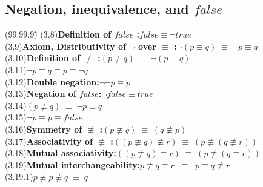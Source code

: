 \documentclass[fleqn, leqno]{article}
\newcommand{\lgap}{2pt}                             %
\newcommand{\equivs}{\ensuremath{\;\equiv\;}}       %
\newcommand{\equivss}{\ensuremath{\;\;\equiv\;\;}}  %
\newcommand{\nequiv}{\ensuremath{\not\equiv}}       %
\begin{document}
\subsection*{Negation, inequivalence, and $false$}
\begin{tabbing}
(99.99.9)\;\=\kill
(3.8)\>\textbf{Definition of $false$ :}\quad $false\equiv \neg true$\\[\lgap]
(3.9)\>\textbf{Axiom, Distributivity of $\neg$ over $\equiv$ :}\quad $\neg (p\equiv q) \equivs \neg p \equiv q$\\[\lgap]
(3.10)\>\textbf{Definition of $\nequiv$ :}\quad $(p\nequiv q)\equivs\neg(p\equiv q)$\\[\lgap]
(3.11)\>$\neg p \equiv q \equiv p \equiv \neg q$\\[\lgap]
(3.12)\>\textbf{Double negation:}\quad $\neg\neg p\equiv p$\\[\lgap]
(3.13)\>\textbf{Negation of $false$:}\quad $\neg false\equiv true$\\[\lgap]
(3.14)\>$(p\nequiv q)\equivs\neg p\equiv q$\\[\lgap]
(3.15)\>$\neg p\equiv p\equiv false$\\[\lgap]
(3.16)\>\textbf{Symmetry of $\nequiv$ :}\quad $(p\nequiv q) \equivs (q\nequiv p)$\\[\lgap]
(3.17)\>\textbf{Associativity of $\nequiv$ :}\quad $((p\nequiv q) \nequiv r)\equivs (p\nequiv (q\nequiv r))$\\[\lgap]
(3.18)\>\textbf{Mutual associativity:}\quad $((p\nequiv q) \equiv r)\equivs (p\nequiv (q\equiv r))$\\[\lgap]
(3.19)\>\textbf{Mutual interchangeability:}\quad $p\nequiv q \equiv r\equivss p\equiv q\nequiv r$\\
(3.19.1)\>$p\nequiv p \nequiv q\equivs q$\\
\end{tabbing}
\end{document}
